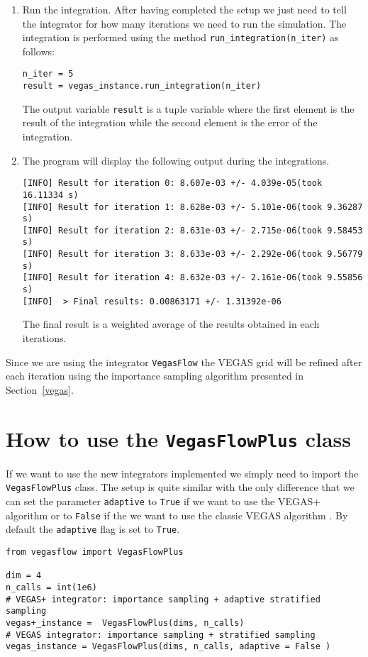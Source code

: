 \documentclass[../main/main.tex]{subfiles}
\begin{document}
\begin{enumerate}
\item Run the integration. After having completed the setup we just need to tell the integrator for how many iterations we need to run the simulation. The integration is performed using the method \texttt{run\_integration(n\_iter)} as follows:
\begin{verbatim}
n_iter = 5
result = vegas_instance.run_integration(n_iter)
\end{verbatim}
The output variable \texttt{result} is a tuple variable where the first element is the result of the integration while the second element is the error of the integration.
\item The program will display the following output during the integrations.
\begin{verbatim}
[INFO] Result for iteration 0: 8.607e-03 +/- 4.039e-05(took 16.11334 s)
[INFO] Result for iteration 1: 8.628e-03 +/- 5.101e-06(took 9.36287 s)
[INFO] Result for iteration 2: 8.631e-03 +/- 2.715e-06(took 9.58453 s)
[INFO] Result for iteration 3: 8.633e-03 +/- 2.292e-06(took 9.56779 s)
[INFO] Result for iteration 4: 8.632e-03 +/- 2.161e-06(took 9.55856 s)
[INFO]  > Final results: 0.00863171 +/- 1.31392e-06
\end{verbatim}
The final result is a weighted average of the results obtained in each iterations.
\end{enumerate}

Since we are using the integrator \texttt{VegasFlow} the VEGAS grid will be refined after each iteration using the importance sampling algorithm presented in Section~\ref{vegas}.

\section{How to use the \texttt{VegasFlowPlus} class}
If we want to use the new integrators implemented we simply need to import the \texttt{VegasFlowPlus} class. The setup is quite similar with the only difference that we can set the parameter \texttt{adaptive} to \texttt{True} if we want to use the VEGAS+ algorithm \cite{Lepage:2020tgj} or to \texttt{False} if the we want to use the classic VEGAS algorithm \cite{Lepage:1977sw}. By default the \texttt{adaptive} flag is set to \texttt{True}.


\begin{verbatim}
from vegasflow import VegasFlowPlus
		
dim = 4
n_calls = int(1e6)
# VEGAS+ integrator: importance sampling + adaptive stratified sampling
vegas+_instance =  VegasFlowPlus(dims, n_calls)
# VEGAS integrator: importance sampling + stratified sampling
vegas_instance = VegasFlowPlus(dims, n_calls, adaptive = False )
\end{verbatim}
\end{document}
